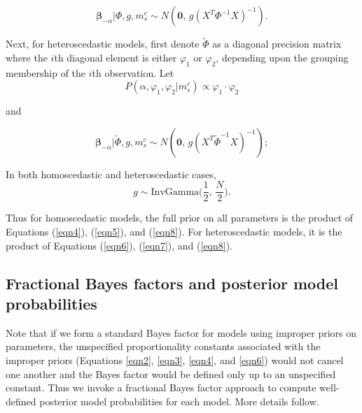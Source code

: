 \begin{equation}\label{eqn5}
\boldsymbol{\beta}_{-\alpha}|\Phi,g,m_s^c \sim N(\boldsymbol{0},\,g(X^T\Phi^{-1} X)^{-1}). 
\end{equation}

\noindent
Next, for heteroscedastic models, first denote $\tilde{\Phi}$ as a diagonal precision matrix where the $i$th diagonal element is either $\varphi_1$ or $\varphi_2$, depending upon the grouping membership of the $i$th observation. Let
\begin{equation}\label{eqn6}
P(\alpha, \varphi_1, \varphi_2|m_s^c)\propto \varphi_1\cdot\varphi_2
\end{equation}

\noindent
and 

\begin{equation}\label{eqn7}
\boldsymbol{\beta}_{-\alpha}|\tilde{\Phi},g,m_s^c \sim N(\boldsymbol{0},\,g(X^T\tilde{\Phi}^{-1} X)^{-1});
\end{equation}

\noindent 
In both homoscedastic and heteroscedastic cases, 
\begin{equation}\label{eqn8}
g\sim \text{InvGamma}\big(\frac{1}{2},\, \frac{N}{2}\big).
\end{equation}

\noindent 
Thus for homoscedastic models, the full prior on all parameters is the product of Equations (\ref{eqn4}), (\ref{eqn5}), and (\ref{eqn8}). For heteroscedastic models, it is the product of Equations (\ref{eqn6}), (\ref{eqn7}), and (\ref{eqn8}). 

\subsection{Fractional Bayes factors and posterior model probabilities}\hypertarget{subsection:FBF}{}

Note that if we form a standard Bayes factor for models using improper priors on parameters, the unspecified proportionality constants associated with the improper priors (Equations \ref{eqn2}, \ref{eqn3}, \ref{eqn4}, and \ref{eqn6}) would not cancel one another and the Bayes factor would be defined only up to an unspecified constant. Thus we invoke a fractional Bayes factor approach \citep{OHaganfbfs} to compute well-defined posterior model probabilities for each model. More details follow.

